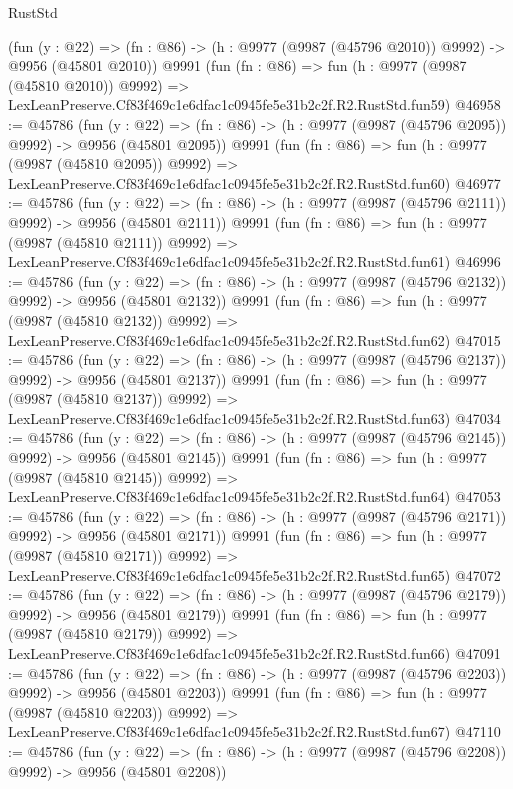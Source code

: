 \begin{lexlean}{RustStd}
\begin{coremodule}
    (fun (y : @22) =>
    (fn : @86) -> (h : @9977 (@9987 (@45796 @2010)) @9992) -> @9956 (@45801 @2010))
    @9991
    (fun (fn : @86) =>
    fun (h : @9977 (@9987 (@45810 @2010)) @9992) =>
    LexLeanPreserve.Cf83f469c1e6dfac1c0945fe5e31b2c2f.R2.RustStd.fun59)
@46958 := @45786
    (fun (y : @22) =>
    (fn : @86) -> (h : @9977 (@9987 (@45796 @2095)) @9992) -> @9956 (@45801 @2095))
    @9991
    (fun (fn : @86) =>
    fun (h : @9977 (@9987 (@45810 @2095)) @9992) =>
    LexLeanPreserve.Cf83f469c1e6dfac1c0945fe5e31b2c2f.R2.RustStd.fun60)
@46977 := @45786
    (fun (y : @22) =>
    (fn : @86) -> (h : @9977 (@9987 (@45796 @2111)) @9992) -> @9956 (@45801 @2111))
    @9991
    (fun (fn : @86) =>
    fun (h : @9977 (@9987 (@45810 @2111)) @9992) =>
    LexLeanPreserve.Cf83f469c1e6dfac1c0945fe5e31b2c2f.R2.RustStd.fun61)
@46996 := @45786
    (fun (y : @22) =>
    (fn : @86) -> (h : @9977 (@9987 (@45796 @2132)) @9992) -> @9956 (@45801 @2132))
    @9991
    (fun (fn : @86) =>
    fun (h : @9977 (@9987 (@45810 @2132)) @9992) =>
    LexLeanPreserve.Cf83f469c1e6dfac1c0945fe5e31b2c2f.R2.RustStd.fun62)
@47015 := @45786
    (fun (y : @22) =>
    (fn : @86) -> (h : @9977 (@9987 (@45796 @2137)) @9992) -> @9956 (@45801 @2137))
    @9991
    (fun (fn : @86) =>
    fun (h : @9977 (@9987 (@45810 @2137)) @9992) =>
    LexLeanPreserve.Cf83f469c1e6dfac1c0945fe5e31b2c2f.R2.RustStd.fun63)
@47034 := @45786
    (fun (y : @22) =>
    (fn : @86) -> (h : @9977 (@9987 (@45796 @2145)) @9992) -> @9956 (@45801 @2145))
    @9991
    (fun (fn : @86) =>
    fun (h : @9977 (@9987 (@45810 @2145)) @9992) =>
    LexLeanPreserve.Cf83f469c1e6dfac1c0945fe5e31b2c2f.R2.RustStd.fun64)
@47053 := @45786
    (fun (y : @22) =>
    (fn : @86) -> (h : @9977 (@9987 (@45796 @2171)) @9992) -> @9956 (@45801 @2171))
    @9991
    (fun (fn : @86) =>
    fun (h : @9977 (@9987 (@45810 @2171)) @9992) =>
    LexLeanPreserve.Cf83f469c1e6dfac1c0945fe5e31b2c2f.R2.RustStd.fun65)
@47072 := @45786
    (fun (y : @22) =>
    (fn : @86) -> (h : @9977 (@9987 (@45796 @2179)) @9992) -> @9956 (@45801 @2179))
    @9991
    (fun (fn : @86) =>
    fun (h : @9977 (@9987 (@45810 @2179)) @9992) =>
    LexLeanPreserve.Cf83f469c1e6dfac1c0945fe5e31b2c2f.R2.RustStd.fun66)
@47091 := @45786
    (fun (y : @22) =>
    (fn : @86) -> (h : @9977 (@9987 (@45796 @2203)) @9992) -> @9956 (@45801 @2203))
    @9991
    (fun (fn : @86) =>
    fun (h : @9977 (@9987 (@45810 @2203)) @9992) =>
    LexLeanPreserve.Cf83f469c1e6dfac1c0945fe5e31b2c2f.R2.RustStd.fun67)
@47110 := @45786
    (fun (y : @22) =>
    (fn : @86) -> (h : @9977 (@9987 (@45796 @2208)) @9992) -> @9956 (@45801 @2208))

\end{coremodule}
\end{lexlean}
